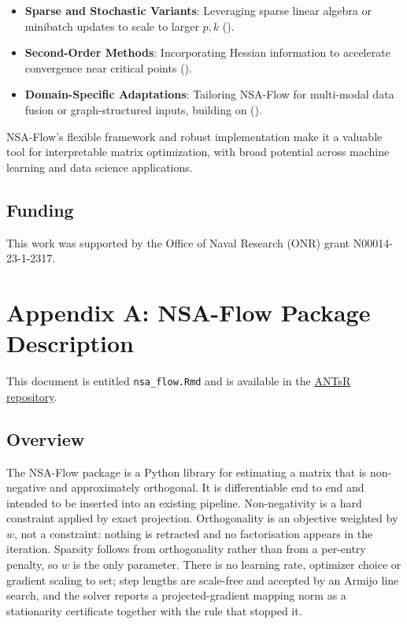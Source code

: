 \documentclass[
]{article}
\begin{document}
\begin{itemize}
\item
  \textbf{Sparse and Stochastic Variants}: Leveraging sparse linear algebra or minibatch updates to scale to larger \(p, k\) ().
\item
  \textbf{Second-Order Methods}: Incorporating Hessian information to accelerate convergence near critical points ().
\item
  \textbf{Domain-Specific Adaptations}: Tailoring NSA-Flow for multi-modal data fusion or graph-structured inputs, building on ().
\end{itemize}

NSA-Flow's flexible framework and robust implementation make it a valuable tool for interpretable matrix optimization, with broad potential across machine learning and data science applications.

\subsection{Funding}\label{funding}

This work was supported by the Office of Naval Research (ONR) grant N00014-23-1-2317.

\section{Appendix A: NSA-Flow Package Description}\label{appendix-a-nsa-flow-package-description}

This document is entitled \texttt{nsa\_flow.Rmd} and is available in the \href{https://github.com/ANTsX/ANTsR}{ANTsR repository}.

\subsection{Overview}\label{overview}

The NSA-Flow package is a Python library for estimating a matrix that is
non-negative and approximately orthogonal. It is differentiable end to end and
intended to be inserted into an existing pipeline. Non-negativity is a hard
constraint applied by exact projection. Orthogonality is an objective weighted
by \(w\), not a constraint: nothing is retracted and no factorisation appears
in the iteration. Sparsity follows from orthogonality rather than from a
per-entry penalty, so \(w\) is the only parameter. There is no learning rate,
optimizer choice or gradient scaling to set; step lengths are scale-free and
accepted by an Armijo line search, and the solver reports a projected-gradient
mapping norm as a stationarity certificate together with the rule that stopped
it.
\end{document}
